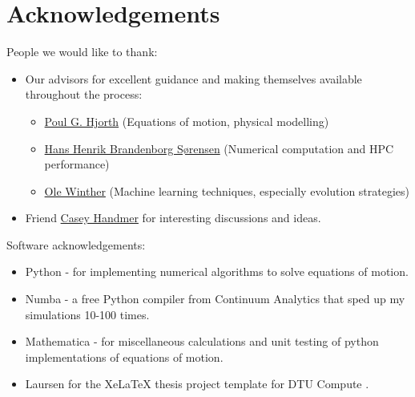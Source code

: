 \chapter{Acknowledgements}
People we would like to thank:
\begin{itemize}
    \item Our advisors for excellent guidance and making themselves available throughout the process:
    \begin{itemize}
        \item \href{http://www.dtu.dk/english/service/phonebook/person?id=901&tab=1}{Poul G. Hjorth} (Equations of motion, physical modelling)
        \item \href{http://www.dtu.dk/english/service/phonebook/person?id=30220&tab=1}{Hans Henrik Brandenborg Sørensen} (Numerical computation and HPC performance)
        \item \href{http://www.dtu.dk/english/service/phonebook/person?id=10167&tab=1}{Ole Winther} (Machine learning techniques, especially evolution strategies)
    \end{itemize}
    \item Friend \href{https://www.linkedin.com/in/casey-handmer-60183262/}{Casey Handmer} for interesting discussions and ideas.
\end{itemize}
\vspace{1cm}
Software acknowledgements: 
\begin{itemize}
    \item Python - for implementing numerical algorithms to solve equations of motion.
    \item Numba - a free Python compiler from Continuum Analytics that sped up my simulations 10-100 times.
    \item Mathematica - for miscellaneous calculations and unit testing of python implementations of equations of motion.
    \item Laursen for the XeLaTeX thesis project template for DTU Compute \cite{laursens}.
\end{itemize}